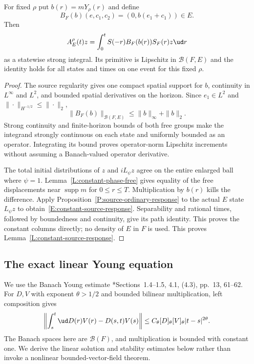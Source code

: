 \begin{lemma}\label{L:constant-source-response}
  For fixed $\rho$ put $b(r)=mY_\rho(r)$ and define
  \[
    B_F(b)(e,c_1,c_2)=(0,b(e_1+c_1))\in E.
  \]
  Then
  \begin{equation}\label{E:constant-source-response}
    A_E^\rho(t)z=\int_0^tS(-r)B_F(b(r))S_F(r)z\ud r
  \end{equation}
  as a statewise strong integral. Its primitive is Lipschitz in
  $\mathcal B(F,E)$ and the identity holds for all states and times
  on one event for this fixed $\rho$.
\end{lemma}

\begin{proof}
  The source regularity gives one compact spatial support for $b$,
  continuity in $L^\infty$ and $L^2$, and bounded spatial derivatives
  on the horizon. Since $e_1\in L^2$ and
  $\|\cdot\|_{H^{-1/2}}\le\|\cdot\|_2$,
  \[
    \|B_F(b)\|_{\mathcal B(F,E)}
    \le\|b\|_\infty+\|b\|_2.
  \]
  Strong continuity and finite-horizon bounds of both free groups make
  the integrand strongly continuous on each state and uniformly bounded
  as an operator. Integrating its bound proves operator-norm Lipschitz
  increments without assuming a Banach-valued operator derivative.

  The total initial distributions of $z$ and $iL_\psi z$ agree on the
  entire enlarged ball where $\psi=1$. Lemma~\ref{L:constant-phase-free}
  gives equality of the free displacements near $\operatorname{supp}m$
  for $0\le r\le T$. Multiplication by $b(r)$ kills the difference.
  Apply Proposition~\ref{P:source-ordinary-response} to the actual
  $E$ state $L_\psi z$ to obtain~\eqref{E:constant-source-response}.
  Separability and rational times, followed by boundedness and
  continuity, give its path identity. This proves the constant columns
  directly; no density of $E$ in $F$ is used.
  This proves Lemma~\ref{L:constant-source-response}.
\end{proof}

\subsection{The exact linear Young equation}

We use the Banach Young estimate
\cite{friz.hairer:20:course}*{Sections~1.4--1.5, 4.1, (4.3),
pp.~13, 61--62}. For $D,V$ with exponent $\theta>1/2$ and bounded
bilinear multiplication, left composition gives
\begin{equation}\label{E:constant-young-estimate}
  \left\|\int_s^t\ud D(r)V(r)-D(s,t)V(s)\right\|
  \le C_\theta[D]_\theta[V]_\theta|t-s|^{2\theta}.
\end{equation}
The Banach spaces here are $\mathcal B(F)$, and multiplication is
bounded with constant one. We derive the linear solution and stability
estimates below rather than invoke a nonlinear bounded-vector-field
theorem.

